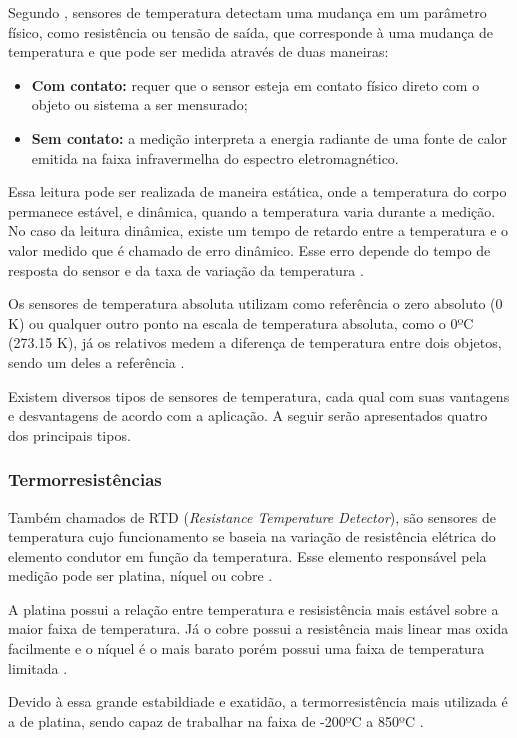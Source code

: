Segundo , sensores de temperatura detectam uma mudança em um parâmetro físico, como
resistência ou tensão de saída, que corresponde à uma mudança de temperatura e que pode ser medida através de
duas maneiras:
\begin{itemize}
	\item \textbf{Com contato:} requer que o sensor esteja em contato físico direto com o objeto ou
	sistema a ser mensurado;
	\item \textbf{Sem contato:} a medição interpreta a energia radiante de uma fonte de calor emitida na
	faixa infravermelha do espectro eletromagnético.
\end{itemize}

Essa leitura pode ser realizada de maneira estática, onde a temperatura do corpo permanece estável, e
dinâmica, quando a temperatura varia durante a medição. No caso da leitura dinâmica, existe um tempo de
retardo entre a temperatura e o valor medido que é chamado de erro dinâmico. Esse erro depende do tempo de
resposta do sensor e da taxa de variação da temperatura .

Os sensores de temperatura absoluta utilizam como referência o zero absoluto (0 K) ou qualquer outro ponto na
escala de temperatura absoluta, como o 0ºC (273.15 K), já os relativos medem a diferença de temperatura entre
dois objetos, sendo um deles a referência \cite{fraden2010}.

Existem diversos tipos de sensores de temperatura, cada qual com suas vantagens e desvantagens de acordo com
a aplicação. A seguir serão apresentados quatro dos principais tipos.

\subsubsection{Termorresistências}
Também chamados de RTD (\textit{Resistance Temperature Detector}), são sensores de temperatura cujo
funcionamento se baseia na variação de resistência elétrica do elemento condutor em função da temperatura.
Esse elemento responsável pela medição pode ser platina, níquel ou cobre \cite{thomazini_albuquerque2005}.

A platina possui a relação entre temperatura e resisistência mais estável sobre a maior faixa de temperatura.
Já o cobre possui a resistência mais linear mas oxida facilmente e o níquel é o mais barato porém possui uma
faixa de temperatura limitada \cite{burns2014}.

Devido à essa grande estabildiade e exatidão, a termorresistência mais utilizada é a de platina, sendo capaz de
trabalhar na faixa de -200ºC a 850ºC \cite{thomazini_albuquerque2005}.

